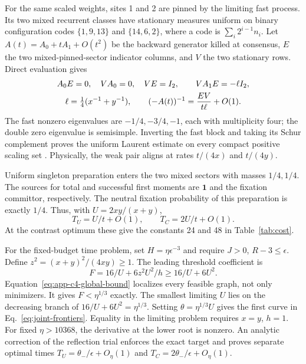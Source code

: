 \documentclass[aps,pre,reprint,amsmath,amssymb,longbibliography]{revtex4-2}
\newcommand{\one}{\bm 1}
\begin{document}
For the same scaled weights, sites 1 and 2 are pinned by the limiting
fast process. Its two mixed recurrent classes have stationary measures
uniform on binary configuration codes \(\{1,9,13\}\) and
\(\{14,6,2\}\), where a code is \(\sum_i2^{i-1}n_i\).
Let \(A(t)=A_0+tA_1+O(t^2)\) be the backward generator killed at
consensus, \(E\) the two mixed-pinned-sector indicator columns, and
\(V\) the two stationary rows. Direct evaluation gives
\begin{gather}
 A_0E=0,\quad VA_0=0,\quad VE=I_2,\qquad
 VA_1E=-\ell I_2,\notag\\
 \ell=\tfrac14(x^{-1}+y^{-1}),\qquad
 (-A(t))^{-1}=\frac{EV}{t\ell}+O(1).
 \label{eq:app-c4-resolvent}
\end{gather}
The fast nonzero eigenvalues are \(-1/4,-3/4,-1\), each with
multiplicity four; the double zero eigenvalue is semisimple. Inverting
the fast block and taking its Schur complement proves the uniform
Laurent estimate on every compact positive scaling set
\cite{SlowAvrachenkovHaviv2004}. Physically, the weak pair aligns at
rates \(t/(4x)\) and \(t/(4y)\).

Uniform singleton preparation enters the two mixed sectors with masses
\(1/4,1/4\). The sources for total and successful first moments are
\(\one\) and the fixation committor, respectively. The neutral
fixation probability of this preparation is exactly \(1/4\).
Thus, with \(U=2xy/(x+y)\),
\begin{equation}
 T_U=U/t+O(1),\qquad T_C=2U/t+O(1).
 \label{eq:app-c4-times}
\end{equation}
At the contrast optimum these give the constants 24 and 48 in
Table~\ref{tab:cost}.

For the fixed-budget time problem, set \(H=\eta\epsilon^{-3}\)
and require \(J>0\), \(R-3\le\epsilon\). Define
\(z^2=(x+y)^2/(4xy)\ge1\). The leading threshold coefficient is
\begin{equation}
 F=16/U+6z^2U^2/h\ge16/U+6U^2.
 \label{eq:app-c4-reduced-objective}
\end{equation}
Equation~\eqref{eq:app-c4-global-bound} localizes every feasible graph,
not only minimizers. It gives \(F<\eta^{1/3}\) exactly. The smallest
limiting \(U\) lies on the decreasing branch of
\(16/U+6U^2=\eta^{1/3}\). Setting \(\theta=\eta^{1/3}U\)
gives the first curve in Eq.~\eqref{eq:joint-frontiers}.
Equality in the limiting problem requires \(x=y\), \(h=1\).
For fixed \(\eta>10368\), the derivative at the lower root is
nonzero. An analytic correction of the reflection trial enforces the
exact target and proves separate optimal times
\(T_U=\theta_-/\epsilon+O_\eta(1)\) and
\(T_C=2\theta_-/\epsilon+O_\eta(1)\).
\end{document}
